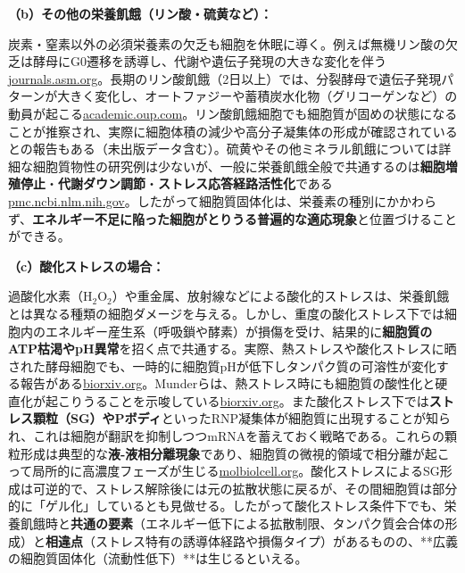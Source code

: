 \textbf{（b）その他の栄養飢餓（リン酸・硫黄など）：}

 炭素・窒素以外の必須栄養素の欠乏も細胞を休眠に導く。例えば無機リン酸の欠乏は酵母にG0遷移を誘導し、代謝や遺伝子発現の大きな変化を伴う\href{https://journals.asm.org/doi/10.1128/mbio.00241-25\#:~:text=Fission\%20yeast\%20metabolome\%20dynamics\%20during,a\%20state\%20of\%20G0\%20quiescence}{journals.asm.org}。長期のリン酸飢餓（2日以上）では、分裂酵母で遺伝子発現パターンが大きく変化し、オートファジーや蓄積炭水化物（グリコーゲンなど）の動員が起こる\href{https://academic.oup.com/nar/article/51/7/3094/7041946\#:~:text=Cellular\%20responses\%20to\%20long,expression\%20whereby\%20the\%20mRNAs}{academic.oup.com}。リン酸飢餓細胞でも細胞質が固めの状態になることが推察され、実際に細胞体積の減少や高分子凝集体の形成が確認されているとの報告もある（未出版データ含む）。硫黄やその他ミネラル飢餓については詳細な細胞質物性の研究例は少ないが、一般に栄養飢餓全般で共通するのは\textbf{細胞増殖停止}・\textbf{代謝ダウン調節}・\textbf{ストレス応答経路活性化}である\href{https://pmc.ncbi.nlm.nih.gov/articles/PMC3123465/\#:~:text=,0\%E2\%80\%93111\%20mm}{pmc.ncbi.nlm.nih.gov}。したがって細胞質固体化は、栄養素の種別にかかわらず、\textbf{エネルギー不足に陥った細胞がとりうる普遍的な適応現象}と位置づけることができる。

\textbf{（c）酸化ストレスの場合：}

 過酸化水素（H$_2$O$_2$）や重金属、放射線などによる酸化的ストレスは、栄養飢餓とは異なる種類の細胞ダメージを与える。しかし、重度の酸化ストレス下では細胞内のエネルギー産生系（呼吸鎖や酵素）が損傷を受け、結果的に\textbf{細胞質のATP枯渇やpH異常}を招く点で共通する。実際、熱ストレスや酸化ストレスに晒された酵母細胞でも、一時的に細胞質pHが低下しタンパク質の可溶性が変化する報告がある\href{https://www.biorxiv.org/content/10.1101/2022.07.29.502016v1.full\#:~:text=Exit\%20of\%20spore\%20dormancy\%20transforms,including\%20during\%20heat}{biorxiv.org}。Munderらは、熱ストレス時にも細胞質の酸性化と硬直化が起こりうることを示唆している\href{https://www.biorxiv.org/content/10.1101/2022.07.29.502016v1.full\#:~:text=Exit\%20of\%20spore\%20dormancy\%20transforms,including\%20during\%20heat}{biorxiv.org}。また酸化ストレス下では\textbf{ストレス顆粒（SG）\textbf{や}Pボディ}といったRNP凝集体が細胞質に出現することが知られ、これは細胞が翻訳を抑制しつつmRNAを蓄えておく戦略である。これらの顆粒形成は典型的な\textbf{液-液相分離現象}であり、細胞質の微視的領域で相分離が起こって局所的に高濃度フェーズが生じる\href{https://www.molbiolcell.org/doi/10.1091/mbc.E20-02-0125\#:~:text=Reorganization\%20of\%20budding\%20yeast\%20cytoplasm,de\%20novo\%20formation\%20of}{molbiolcell.org}。酸化ストレスによるSG形成は可逆的で、ストレス解除後には元の拡散状態に戻るが、その間細胞質は部分的に「ゲル化」しているとも見做せる。したがって酸化ストレス条件下でも、栄養飢餓時と\textbf{共通の要素}（エネルギー低下による拡散制限、タンパク質会合体の形成）と\textbf{相違点}（ストレス特有の誘導体経路や損傷タイプ）があるものの、**広義の細胞質固体化（流動性低下）**は生じるといえる。

